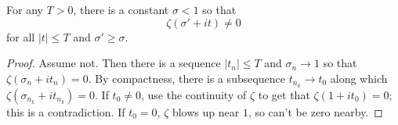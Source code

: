 \begin{lemma}[ZetaNoZerosInBox]
\label{ZetaNoZerosInBox}
\leanok
For any $T>0$, there is a constant $\sigma<1$ so that
  $$
  \zeta(\sigma'+it) \ne 0
  $$
  for all $|t| \leq T$ and $\sigma' \ge \sigma$.
\end{lemma}
\begin{proof}
\leanok
Assume not. Then there is a sequence $|t_n| \le T$ and $\sigma_n \to 1$ so that
  $\zeta(\sigma_n + it_n) = 0$.
  By compactness, there is a subsequence $t_{n_k} \to t_0$ along which
  $\zeta(\sigma_{n_k} + it_{n_k}) = 0$.
  If $t_0\ne0$, use the continuity of $\zeta$ to get that $\zeta(1 + it_0) = 0$;
  this is a contradiction.
  If $t_0=0$, $\zeta$ blows up near $1$, so can't be zero nearby.
\end{proof}
